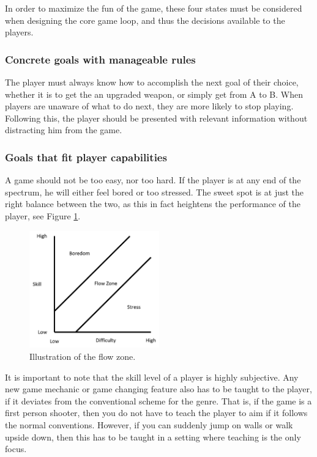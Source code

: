 In order to maximize the fun of the game, these four states must be considered when designing the core game loop, and thus the decisions available to the players.

\subsubsection{Concrete goals with manageable rules}
The player must always know how to accomplish the next goal of their choice, whether it is to get the an upgraded weapon, or simply get from A to B.
When players are unaware of what to do next, they are more likely to stop playing.
Following this, the player should be presented with relevant information without distracting him from the game.

\subsubsection{Goals that fit player capabilities}
A game should not be too easy, nor too hard.
If the player is at any end of the spectrum, he will either feel bored or too stressed.
The sweet spot is at just the right balance between the two, as this in fact heightens the performance of the player, see Figure \ref{gamedesign:flowzone}.
\begin{figure}
    \includegraphics[width=0.5\textwidth]{figures/gamedesign/flowZone}
    \caption{Illustration of the flow zone.}
    \label{gamedesign:flowzone}
\end{figure}

It is important to note that the skill level of a player is highly subjective.
Any new game mechanic or game changing feature also has to be taught to the player, if it deviates from the conventional scheme for the genre.
That is, if the game is a first person shooter, then you do not have to teach
the player to aim if it follows the normal conventions. However, if you can suddenly
jump on walls or walk upside down, then this has to be taught in a setting
where teaching is the only focus.

